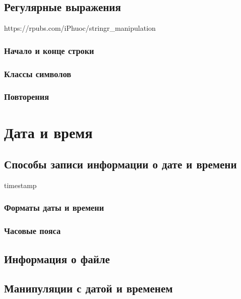 \documentclass[
  letterpaper,
]{scrbook}
\theoremstyle{definition}
\theoremstyle{remark}
\begin{document}
\section{Регулярные выражения}\label{rstrings-regex}

https://rpubs.com/iPhuoc/stringr\_manipulation

\subsection{Начало и конце строки}\label{rstrings-regex-startend}

\subsection{Классы символов}\label{rstrings-regex-classes}

\subsection{Повторения}\label{rstrings-regex-repetition}


\chapter{Дата и время}\label{rdates}

\section{Способы записи информации о дате и
времени}\label{rdates-storing}

timestamp

\subsection{Форматы даты и времени}\label{rdates-formats}

\subsection{Часовые пояса}\label{rdates-timezone}

\section{Информация о файле}\label{rdates-fileinfo}

\section{Манипуляции с датой и временем}\label{rdates-manipulations}
\end{document}
